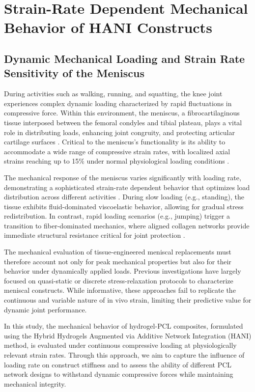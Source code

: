 \chapter{Strain-Rate Dependent Mechanical Behavior of HANI Constructs}\label{chap:6}


\section{Dynamic Mechanical Loading and Strain Rate Sensitivity of the Meniscus}

During activities such as walking, running, and squatting, the knee joint experiences complex dynamic loading characterized by rapid fluctuations in compressive force. Within this environment, the meniscus, a fibrocartilaginous tissue interposed between the femoral condyles and tibial plateau, plays a vital role in distributing loads, enhancing joint congruity, and protecting articular cartilage surfaces \cite{thambyah2006mechanicalproperties}. Critical to the meniscus's functionality is its ability to accommodate a wide range of compressive strain rates, with localized axial strains reaching up to 15\% under normal physiological loading conditions \cite{morejon2020compressiveproperties}.

The mechanical response of the meniscus varies significantly with loading rate, demonstrating a sophisticated strain-rate dependent behavior that optimizes load distribution across different activities \cite{danso2014comparisonnonlinear}. During slow loading (e.g., standing), the tissue exhibits fluid-dominated viscoelastic behavior, allowing for gradual stress redistribution. In contrast, rapid loading scenarios (e.g., jumping) trigger a transition to fiber-dominated mechanics, where aligned collagen networks provide immediate structural resistance critical for joint protection \cite{morejon2023tensileenergy, norberg2021viscoelasticequilibrium}.

The mechanical evaluation of tissue-engineered meniscal replacements must therefore account not only for peak mechanical properties but also for their behavior under dynamically applied loads. Previous investigations have largely focused on quasi-static or discrete stress-relaxation protocols to characterize meniscal constructs. While informative, these approaches fail to replicate the continuous and variable nature of in vivo strain, limiting their predictive value for dynamic joint performance.

In this study, the mechanical behavior of hydrogel-PCL composites, formulated using the Hybrid Hydrogels Augmented via Additive Network Integration (HANI) method, is evaluated under continuous compressive loading at physiologically relevant strain rates. Through this approach, we aim to capture the influence of loading rate on construct stiffness and to assess the ability of different PCL network designs to withstand dynamic compressive forces while maintaining mechanical integrity.

